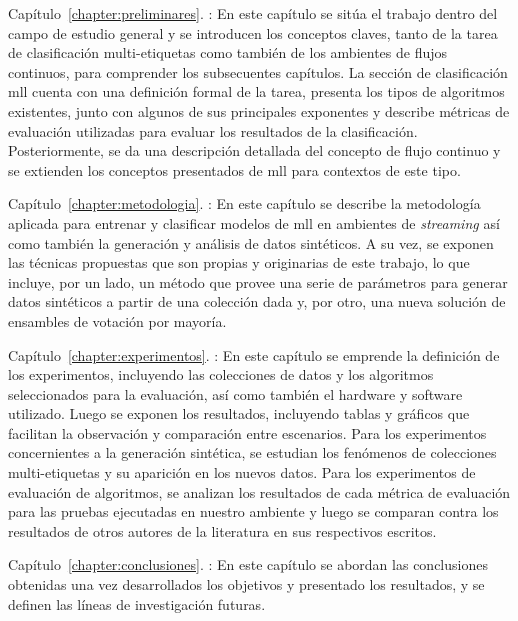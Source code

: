 \begin{description}

	\item{Capítulo~\ref{chapter:preliminares}. }:
	      En este capítulo se sitúa el trabajo dentro del campo de estudio general
	      y se introducen los conceptos claves, tanto de la tarea de clasificación
	      multi-etiquetas como también de los ambientes de flujos continuos, para
	      comprender los subsecuentes capítulos. La sección de clasificación
	      \acrshort{mll} cuenta con una definición formal de la tarea, presenta
	      los tipos de algoritmos existentes, junto con algunos de sus principales
	      exponentes y describe métricas de evaluación utilizadas para evaluar los
	      resultados de la clasificación.  Posteriormente, se da una descripción
	      detallada del concepto de flujo continuo y se extienden los conceptos
	      presentados de \acrshort{mll} para contextos de este tipo.

	\item{Capítulo~\ref{chapter:metodologia}. }: En
	      este capítulo se describe la metodología aplicada para entrenar y
	      clasificar modelos de \acrshort{mll} en ambientes de \textit{streaming}
	      así como también la generación y análisis de datos sintéticos. A su vez,
	      se exponen las técnicas propuestas que son propias y originarias de este
	      trabajo, lo que incluye, por un lado, un método que provee una serie de
	      parámetros para generar datos sintéticos a partir de una colección dada
	      y, por otro, una nueva solución de ensambles de votación por mayoría.

	\item{Capítulo~\ref{chapter:experimentos}. }:
	      En este capítulo se emprende la definición de los experimentos,
	      incluyendo las colecciones de datos y los algoritmos seleccionados para
	      la evaluación, así como también el hardware y software utilizado. Luego
	      se exponen los resultados, incluyendo tablas y gráficos que facilitan la
	      observación y comparación entre escenarios. Para los experimentos
	      concernientes a la generación sintética, se estudian los fenómenos de
	      colecciones multi-etiquetas y su aparición en los nuevos datos. Para los
	      experimentos de evaluación de algoritmos, se analizan los resultados de
	      cada métrica de evaluación para las pruebas ejecutadas en nuestro
	      ambiente y luego se comparan contra los resultados de otros autores de
	      la literatura en sus respectivos escritos.

	\item{Capítulo~\ref{chapter:conclusiones}. }:
	      En este capítulo se abordan las conclusiones obtenidas una vez
	      desarrollados los objetivos y presentado los resultados, y se definen
	      las líneas de investigación futuras.

\end{description}
